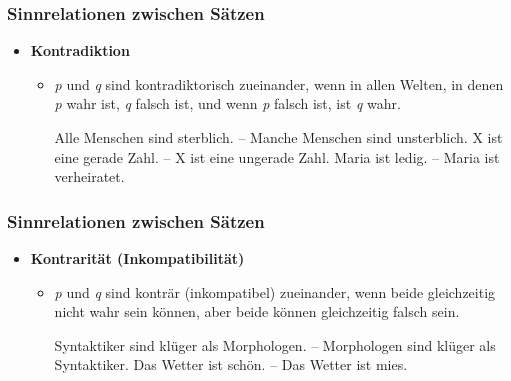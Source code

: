 \begin{frame}
\frametitle{Sinnrelationen zwischen Sätzen}

\begin{itemize}
	\item \textbf{Kontradiktion}
	
\vspace{1em}

	\begin{itemize}
		\item \textit{p} und \textit{q} sind kontradiktorisch zueinander, wenn in allen Welten, in denen \textit{p} wahr ist, \textit{q} falsch ist, und wenn \textit{p} falsch ist, ist \textit{q} wahr.
		
\vspace{1em}

		\eal
			\ex Alle Menschen sind sterblich. -- Manche Menschen sind unsterblich.
			\ex X ist eine gerade Zahl. -- X ist eine ungerade Zahl.
			\ex Maria ist ledig. -- Maria ist verheiratet.
		\zl
		
	\end{itemize}
	
\end{itemize}


\end{frame}



\begin{frame}
\frametitle{Sinnrelationen zwischen Sätzen}

\begin{itemize}
	\item \textbf{Kontrarität (Inkompatibilität)}
	
\vspace{1em}

	\begin{itemize}
		\item \textit{p} und \textit{q }sind konträr (inkompatibel) zueinander, wenn beide gleichzeitig nicht wahr sein können, aber beide können gleichzeitig falsch sein.

\vspace{1em}
		
	\eal
		\ex Syntaktiker sind klüger als Morphologen. -- Morphologen sind klüger als Syntaktiker.		
		\ex Das Wetter ist schön. -- Das Wetter ist mies.
	\zl
		
	\end{itemize}
	
\end{itemize}


\end{frame}
